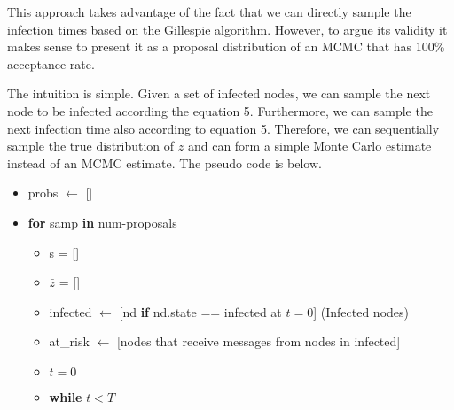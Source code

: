 \documentclass{article}
\begin{document}
This approach takes advantage of the fact that we can directly sample the infection times based on the Gillespie algorithm.  
However, to argue its validity it makes sense to present it as a proposal distribution of an MCMC that has 100\% acceptance rate. 

The intuition is simple. Given a set of infected nodes, we can sample the next node to be infected according the equation 5.  
Furthermore, we can sample the next infection time also according to equation 5.  Therefore, we can sequentially sample the true 
distribution of $\bar{z}$ and can form a simple Monte Carlo estimate instead of an MCMC estimate.  The pseudo code is below.   

\begin{itemize}

\item probs $\leftarrow$ []
\item \textbf{for} samp \textbf{in} num-proposals
\begin{itemize}

\item s = []
\item $\bar{z}$ = []
\item infected  $\leftarrow$ [nd \textbf{if} nd.state == infected at $t=0$] (Infected nodes)
\item at\_risk $\leftarrow$ [nodes that receive messages from nodes in infected]
\item $t = 0$
\item \textbf{while} $t <T$
\begin{itemize}


\end{itemize}
\end{itemize}
\end{itemize}
\end{document}
